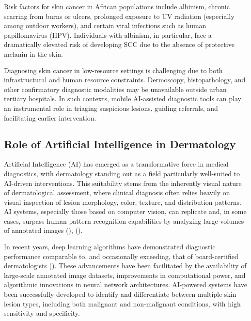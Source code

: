 \documentclass[
  12pt,
  oneside]{article}
\begin{document}
Risk factors for skin cancer in African populations include albinism,
chronic scarring from burns or ulcers, prolonged exposure to UV
radiation (especially among outdoor workers), and certain viral
infections such as human papillomavirus (HPV). Individuals with
albinism, in particular, face a dramatically elevated risk of developing
SCC due to the absence of protective melanin in the skin.

Diagnosing skin cancer in low-resource settings is challenging due to
both infrastructural and human resource constraints. Dermoscopy,
histopathology, and other confirmatory diagnostic modalities may be
unavailable outside urban tertiary hospitals. In such contexts, mobile
AI-assisted diagnostic tools can play an instrumental role in triaging
suspicious lesions, guiding referrals, and facilitating earlier
intervention.

\subsection{Role of Artificial Intelligence in
Dermatology}\label{role-of-artificial-intelligence-in-dermatology}

Artificial Intelligence (AI) has emerged as a transformative force in
medical diagnostics, with dermatology standing out as a field
particularly well-suited to AI-driven interventions. This suitability
stems from the inherently visual nature of dermatological assessment,
where clinical diagnosis often relies heavily on visual inspection of
lesion morphology, color, texture, and distribution patterns. AI
systems, especially those based on computer vision, can replicate and,
in some cases, surpass human pattern recognition capabilities by
analyzing large volumes of annotated images
(),
().

In recent years, deep learning algorithms have demonstrated diagnostic
performance comparable to, and occasionally exceeding, that of
board-certified dermatologists
(). These
advancements have been facilitated by the availability of large-scale
annotated image datasets, improvements in computational power, and
algorithmic innovations in neural network architectures. AI-powered
systems have been successfully developed to identify and differentiate
between multiple skin lesion types, including both malignant and
non-malignant conditions, with high sensitivity and specificity.
\end{document}
